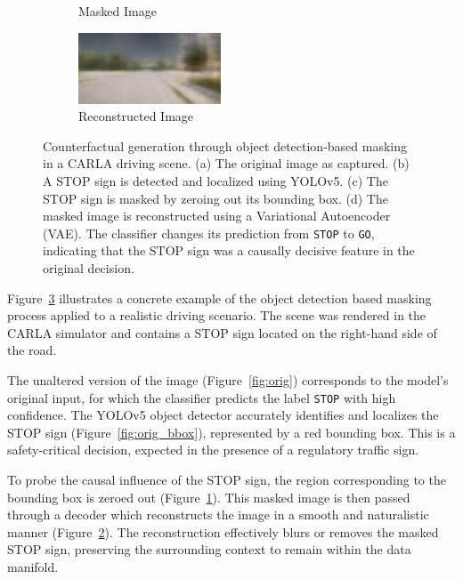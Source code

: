 \begin{figure}[htbp]
\begin{subfigure}[b]{0.24\textwidth}
    \caption{Masked Image}
    \label{fig:masked}
\end{subfigure}
\hfill
\begin{subfigure}[b]{0.24\textwidth}
    \includegraphics[width=\textwidth]{img/masking/object_detection/CE.png}
    \caption{Reconstructed Image}
    \label{fig:reconstructed}
\end{subfigure}
\caption{
Counterfactual generation through object detection-based masking in a CARLA driving scene. (a) The original image as captured. (b) A STOP sign is detected and localized using YOLOv5. (c) The STOP sign is masked by zeroing out its bounding box. (d) The masked image is reconstructed using a Variational Autoencoder (VAE). The classifier changes its prediction from \texttt{STOP} to \texttt{GO}, indicating that the STOP sign was a causally decisive feature in the original decision.
}
\label{fig:object_detection_masking}
\end{figure}


Figure~\ref{fig:object_detection_masking} illustrates a concrete example of the object detection based masking process applied to a realistic driving scenario. The scene was rendered in the CARLA simulator and contains a STOP sign located on the right-hand side of the road.

The unaltered version of the image (Figure~\ref{fig:orig}) corresponds to the model's original input, for which the classifier predicts the label \texttt{STOP} with high confidence. The YOLOv5 object detector accurately identifies and localizes the STOP sign (Figure~\ref{fig:orig_bbox}), represented by a red bounding box. This is a safety-critical decision, expected in the presence of a regulatory traffic sign.

To probe the causal influence of the STOP sign, the region corresponding to the bounding box is zeroed out (Figure~\ref{fig:masked}). This masked image is then passed through a decoder which reconstructs the image in a smooth and naturalistic manner (Figure~\ref{fig:reconstructed}). The reconstruction effectively blurs or removes the masked STOP sign, preserving the surrounding context to remain within the data manifold.

